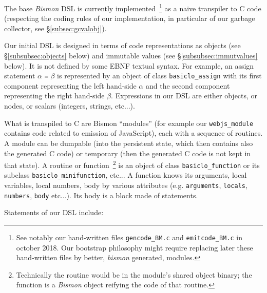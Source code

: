 The base \emph{Bismon} DSL is currently implemented~\footnote{See
  notably our hand-written files \texttt{gencode\_BM.c} and
  \texttt{emitcode\_BM.c} in october 2018. Our bootstrap philosophy
  might require replacing later these hand-written files by better,
  \emph{bismon} generated, modules.} as a naive transpiler to C code
(respecting the coding rules of our implementation, in particular of
our garbage collector, see §\ref{subsec:gcvalobj}).

Our initial DSL is designed in terms of code representations as
objects (see §\ref{subsubsec:objects} below) and immutable values (see
§\ref{subsubsec:immutvalues} below). It is not defined by some EBNF
textual syntax. For example, an assign statement $\alpha$ \texttt{=} $\beta$
is represented by an object of class \texttt{basiclo\_assign}
     with its
first component representing the left hand-side $\alpha$ and the
second component representing the right hand-side $\beta$. Expressions
in our DSL are either objects, or nodes, or scalars (integers,
strings, etc...).


What is transpiled to C are Bismon ``modules'' (for example our
\texttt{webjs\_module} contains code related to emission of
JavaScript), each with a sequence of routines. A module can be
dumpable (into the persistent state, which then contains also the
generated C code) or temporary (then the generated C code is not kept
in that state). A routine or function~\footnote{Technically the
  routine would be in the module's shared object binary; the function
  is a \emph{Bismon} object reifying the code of that routine.}  is an
object of class \texttt{basiclo\_function}
or its subclass
\texttt{basiclo\_minifunction}, etc... A function knows its arguments,
local variables, local numbers, body by various attributes
(e.g. \texttt{arguments}, \texttt{locals}, \texttt{numbers},
\texttt{body} etc...). Its body is a block made of statements.

Statements of our DSL include:

